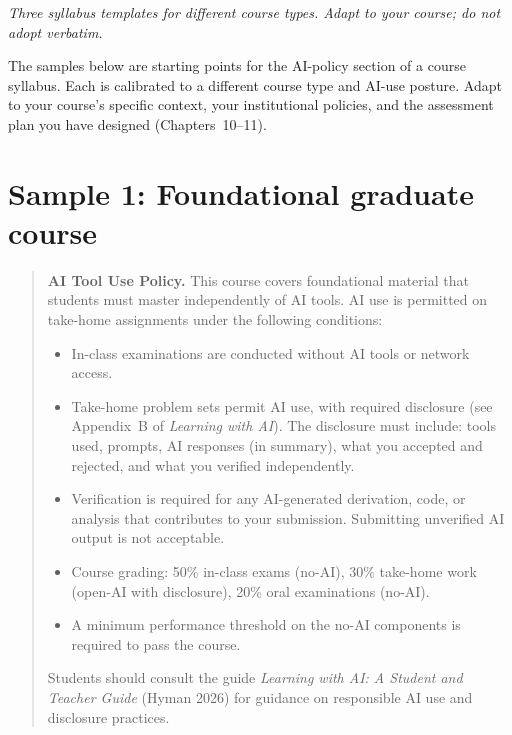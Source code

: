 \documentclass[11pt]{book}
\begin{document}
\noindent \emph{Three syllabus templates for different course types. Adapt to your course; do not adopt verbatim.}

\medskip

The samples below are starting points for the AI-policy section of a course syllabus. Each is calibrated to a different course type and AI-use posture. Adapt to your course's specific context, your institutional policies, and the assessment plan you have designed (Chapters~10--11).

\section*{Sample 1: Foundational graduate course}

\medskip

\begin{quote}
\textbf{AI Tool Use Policy.} This course covers foundational material that students must master independently of AI tools. AI use is permitted on take-home assignments under the following conditions:

\begin{itemize}\setlength{\itemsep}{2pt}
\item In-class examinations are conducted without AI tools or network access.
\item Take-home problem sets permit AI use, with required disclosure (see Appendix~B of \emph{Learning with AI}). The disclosure must include: tools used, prompts, AI responses (in summary), what you accepted and rejected, and what you verified independently.
\item Verification is required for any AI-generated derivation, code, or analysis that contributes to your submission. Submitting unverified AI output is not acceptable.
\item Course grading: 50\% in-class exams (no-AI), 30\% take-home work (open-AI with disclosure), 20\% oral examinations (no-AI).
\item A minimum performance threshold on the no-AI components is required to pass the course.
\end{itemize}

\noindent Students should consult the guide \emph{Learning with AI: A Student and Teacher Guide} (Hyman 2026) for guidance on responsible AI use and disclosure practices.
\end{quote}
\end{document}
